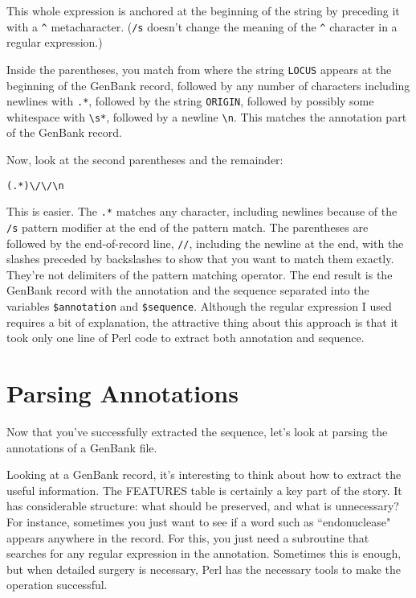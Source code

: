This whole expression is anchored at the beginning of the string by preceding it with a \verb|^| metacharacter. (\verb|/s| doesn't change the meaning of the \verb|^| character in a regular expression.)

Inside the parentheses, you match from where the string \verb|LOCUS| appears at the beginning of the GenBank record, followed by any number of characters including newlines with \verb|.*|, followed by the string \verb|ORIGIN|, followed by possibly some whitespace with \verb|\s*|, followed by a newline \verb|\n|. This matches the annotation part of the GenBank record.

Now, look at the second parentheses and the remainder:

\begin{lstlisting}
(.*)\/\/\n
\end{lstlisting}

This is easier. The \verb|.*| matches any character, including newlines because of the \verb|/s| pattern modifier at the end of the pattern match. The parentheses are followed by the end-of-record line, \verb|//|, including the newline at the end, with the slashes preceded by backslashes to show that you want to match them exactly. They're not delimiters of the pattern matching operator. The end result is the GenBank record with the annotation and the sequence separated into the variables \verb|$annotation| and \verb|$sequence|. Although the regular expression I used requires a bit of explanation, the attractive thing about this approach is that it took only one line of Perl code to extract both annotation and sequence.

\section{Parsing Annotations}
Now that you've successfully extracted the sequence, let's look at parsing the annotations of a GenBank file.

Looking at a GenBank record, it's interesting to think about how to extract the useful information. The FEATURES table is certainly a key part of the story. It has considerable structure: what should be preserved, and what is unnecessary? For instance, sometimes you just want to see if a word such as ``endonuclease" appears anywhere in the record. For this, you just need a subroutine that searches for any regular expression in the annotation. Sometimes this is enough, but when detailed surgery is necessary, Perl has the necessary tools to make the operation successful.

